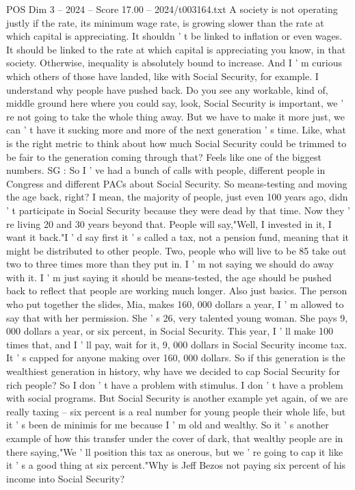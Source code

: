 \begin{textsample}{POS Dim 3 – 2024 – Score 17.00 – 2024/t003164.txt}
A society is not operating justly if the rate, its minimum wage rate, is growing slower than the rate at which capital is appreciating.
It shouldn ' t be linked to inflation or even wages.
It should be linked to the rate at which capital is appreciating you know, in that society.
Otherwise, inequality is absolutely bound to increase.
And I ' m curious which others of those have landed, like with Social Security, for example.
I understand why people have pushed back.
Do you see any workable, kind of, middle ground here where you could say, look, Social Security is important, we ' re not going to take the whole thing away.
But we have to make it more just, we can ' t have it sucking more and more of the next generation ' s time.
Like, what is the right metric to think about how much Social Security could be trimmed to be fair to the generation coming through that?
Feels like one of the biggest numbers.
SG : So I ' ve had a bunch of calls with people, different people in Congress and different PACs about Social Security.
So means-testing and moving the age back, right?
I mean, the majority of people, just even 100 years ago, didn ' t participate in Social Security because they were dead by that time.
Now they ' re living 20 and 30 years beyond that.
People will say,"Well, I invested in it, I want it back."I ' d say first it ' s called a tax, not a pension fund, meaning that it might be distributed to other people.
Two, people who will live to be 85 take out two to three times more than they put in.
I ' m not saying we should do away with it.
I ' m just saying it should be means-tested, the age should be pushed back to reflect that people are working much longer.
Also just basics.
The person who put together the slides, Mia, makes 160, 000 dollars a year, I ' m allowed to say that with her permission.
She ' s 26, very talented young woman.
She pays 9, 000 dollars a year, or six percent, in Social Security.
This year, I ' ll make 100 times that, and I ' ll pay, wait for it, 9, 000 dollars in Social Security income tax.
It ' s capped for anyone making over 160, 000 dollars.
So if this generation is the wealthiest generation in history, why have we decided to cap Social Security for rich people?
So I don ' t have a problem with stimulus.
I don ' t have a problem with social programs.
But Social Security is another example yet again, of we are really taxing -- six percent is a real number for young people their whole life, but it ' s been de minimis for me because I ' m old and wealthy.
So it ' s another example of how this transfer under the cover of dark, that wealthy people are in there saying,"We ' ll position this tax as onerous, but we ' re going to cap it like it ' s a good thing at six percent."Why is Jeff Bezos not paying six percent of his income into Social Security?

\end{textsample}
